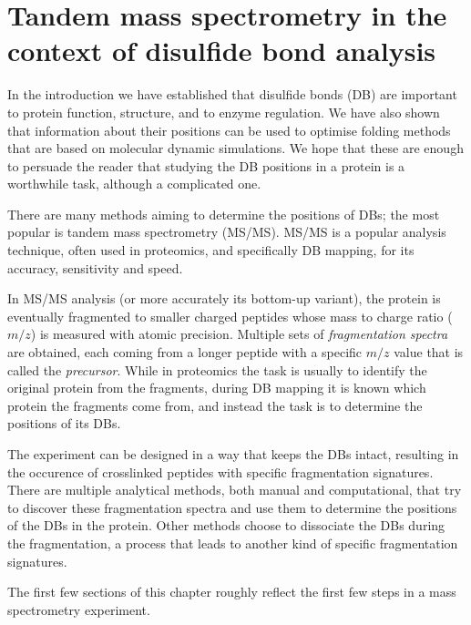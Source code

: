 \chapter{Tandem mass spectrometry in the context of disulfide bond analysis}

In the introduction we have established that disulfide bonds (DB) are important to protein function, structure, and to enzyme regulation. We have also shown that information about their positions can be used to optimise folding methods that are based on molecular dynamic simulations. We hope that these are enough to persuade the reader that studying the DB positions in a protein is a worthwhile task, although a complicated one.

There are many methods aiming to determine the positions of DBs; the most popular is tandem mass spectrometry (MS/MS). MS/MS is a popular analysis technique, often used in proteomics, and specifically DB mapping, for its accuracy, sensitivity and speed.~\cite{gorman2002protein}

In MS/MS analysis (or more accurately its bottom-up variant), the protein is eventually fragmented to smaller charged peptides whose mass to charge ratio (\(m/z\)) is measured with atomic precision. Multiple sets of \emph{fragmentation spectra} are obtained, each coming from a longer peptide with a specific \(m/z\) value that is called the \emph{precursor}. While in proteomics the task is usually to identify the original protein from the fragments, during DB mapping it is known which protein the fragments come from, and instead the task is to determine the positions of its DBs.

The experiment can be designed in a way that keeps the DBs intact, resulting in the occurence of crosslinked peptides with specific fragmentation signatures. There are multiple analytical methods, both manual and computational, that try to discover these fragmentation spectra and use them to determine the positions of the DBs in the protein. Other methods choose to dissociate the DBs during the fragmentation, a process that leads to another kind of specific fragmentation signatures.

The first few sections of this chapter roughly reflect the first few steps in a mass spectrometry experiment.

